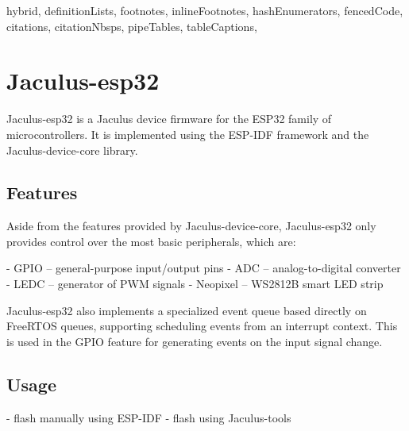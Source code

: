 \begin{markdown*}{%
  hybrid,
  definitionLists,
  footnotes,
  inlineFootnotes,
  hashEnumerators,
  fencedCode,
  citations,
  citationNbsps,
  pipeTables,
  tableCaptions,
}

\chapter{Jaculus-esp32}

Jaculus-esp32 is a Jaculus device firmware for the ESP32 family of microcontrollers. It is implemented using the ESP-IDF framework and the Jaculus-device-core library.

\section{Features}

Aside from the features provided by Jaculus-device-core, Jaculus-esp32 only provides control over the most basic peripherals, which are:

  - GPIO -- general-purpose input/output pins
  - ADC -- analog-to-digital converter
  - LEDC -- generator of PWM signals
  - Neopixel -- WS2812B smart LED strip

Jaculus-esp32 also implements a specialized event queue based directly on FreeRTOS queues, supporting scheduling events from an interrupt context. This is used in the GPIO feature for generating events on the input signal change.


\section{Usage}

  - flash manually using ESP-IDF
  - flash using Jaculus-tools


\end{markdown*}
